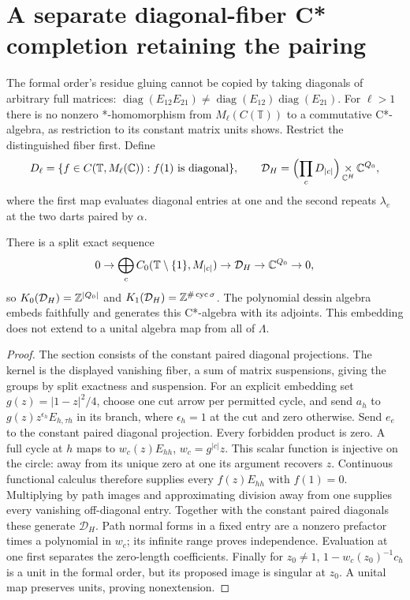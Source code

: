 \section{A separate diagonal-fiber C* completion retaining the pairing}
The formal order's residue gluing cannot be copied by taking diagonals of arbitrary full matrices: $\operatorname{diag}(E_{12}E_{21})\ne\operatorname{diag}(E_{12})\operatorname{diag}(E_{21})$. For $\ell>1$ there is no nonzero *-homomorphism from $M_\ell(C(\mathbb T))$ to a commutative C*-algebra, as restriction to its constant matrix units shows. Restrict the distinguished fiber first. Define
\[
 D_\ell=\{f\in C(\mathbb T,M_\ell(\mathbb C)):f(1)\text{ is diagonal}\},\qquad
 \mathcal D_H=\Bigl(\prod_cD_{|c|}\Bigr)\mathop{\times}_{\mathbb C^H}\mathbb C^{Q_0},
\]
where the first map evaluates diagonal entries at one and the second repeats $\lambda_e$ at the two darts paired by $\alpha$.
\begin{theorem}\label{thm:diagonalmodel}
There is a split exact sequence
\[
 0\to\bigoplus_c C_0(\mathbb T\setminus\{1\},M_{|c|})
 \to\mathcal D_H\to\mathbb C^{Q_0}\to0,
\]
so $K_0(\mathcal D_H)=\mathbb Z^{|Q_0|}$ and $K_1(\mathcal D_H)=\mathbb Z^{\#\operatorname{cyc}\sigma}$. The polynomial dessin algebra embeds faithfully and generates this C*-algebra with its adjoints. This embedding does not extend to a unital algebra map from all of $\Lambda$.
\end{theorem}
\begin{proof}
The section consists of the constant paired diagonal projections. The kernel is the displayed vanishing fiber, a sum of matrix suspensions, giving the groups by split exactness and suspension. For an explicit embedding set $g(z)=|1-z|^2/4$, choose one cut arrow per permitted cycle, and send $a_h$ to $g(z)z^{\epsilon_h}E_{h,\tau h}$ in its branch, where $\epsilon_h=1$ at the cut and zero otherwise. Send $e_e$ to the constant paired diagonal projection. Every forbidden product is zero. A full cycle at $h$ maps to $w_c(z)E_{hh}$, $w_c=g^{|c|}z$. This scalar function is injective on the circle: away from its unique zero at one its argument recovers $z$. Continuous functional calculus therefore supplies every $f(z)E_{hh}$ with $f(1)=0$. Multiplying by path images and approximating division away from one supplies every vanishing off-diagonal entry. Together with the constant paired diagonals these generate $\mathcal D_H$. Path normal forms in a fixed entry are a nonzero prefactor times a polynomial in $w_c$; its infinite range proves independence. Evaluation at one first separates the zero-length coefficients. Finally for $z_0\ne1$, $1-w_c(z_0)^{-1}c_h$ is a unit in the formal order, but its proposed image is singular at $z_0$. A unital map preserves units, proving nonextension.
\end{proof}
